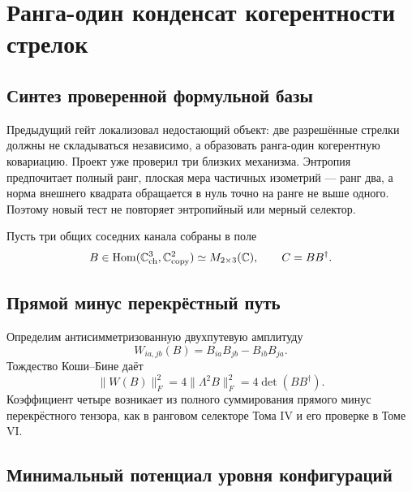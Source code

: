 \chapter{Ранга-один конденсат когерентности стрелок}
\label{ch:v7-edge-coherence-rank-one-condensate-gate}

\section{Синтез проверенной формульной базы}

Предыдущий гейт локализовал недостающий объект: две разрешённые стрелки
должны не складываться независимо, а образовать ранга-один когерентную
ковариацию. Проект уже проверил три близких механизма. Энтропия предпочитает
полный ранг, плоская мера частичных изометрий --- ранг два, а норма внешнего
квадрата обращается в нуль точно на ранге не выше одного. Поэтому новый тест
не повторяет энтропийный или мерный селектор.

Пусть три общих соседних канала собраны в поле
\begin{equation}
 B\in\operatorname{Hom}(\mathbb C_{\rm ch}^3,
 \mathbb C_{\rm copy}^2)\simeq M_{2\times3}(\mathbb C),
 \qquad C=BB^\dagger.
 \label{eq:v7-edge-coherence-field}
\end{equation}

\section{Прямой минус перекрёстный путь}

Определим антисимметризованную двухпутевую амплитуду
\begin{equation}
 W_{ia,jb}(B)=B_{ia}B_{jb}-B_{ib}B_{ja}.
 \label{eq:v7-edge-coherence-wedge-tensor}
\end{equation}
Тождество Коши--Бине даёт
\begin{equation}
 \|W(B)\|_F^2
 =4\|\Lambda^2B\|_F^2
 =4\det(BB^\dagger).
 \label{eq:v7-edge-coherence-wedge-identity}
\end{equation}
Коэффициент четыре возникает из полного суммирования прямого минус
перекрёстного тензора, как в ранговом селекторе Тома IV и его проверке в
Томе VI.

\section{Минимальный потенциал уровня конфигураций}

